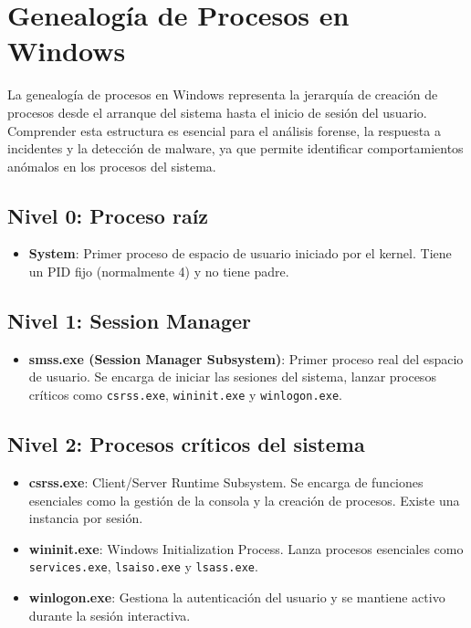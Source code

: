 \chapter{Genealogía de Procesos en Windows}

La genealogía de procesos en Windows representa la jerarquía de creación de
procesos desde el arranque del sistema hasta el inicio de sesión del usuario.
Comprender esta estructura es esencial para el análisis forense, la respuesta a
incidentes y la detección de malware, ya que permite identificar comportamientos
anómalos en los procesos del sistema.

\section*{Nivel 0: Proceso raíz}

\begin{itemize}
    \item \textbf{System}: Primer proceso de espacio de usuario iniciado por el
    kernel. Tiene un PID fijo (normalmente 4) y no tiene padre.
\end{itemize}

\section*{Nivel 1: Session Manager}

\begin{itemize}
    \item \textbf{smss.exe (Session Manager Subsystem)}: Primer proceso real del
    espacio de usuario. Se encarga de iniciar las sesiones del sistema, lanzar
    procesos críticos como \texttt{csrss.exe}, \texttt{wininit.exe} y
    \texttt{winlogon.exe}.
\end{itemize}

\section*{Nivel 2: Procesos críticos del sistema}

\begin{itemize}
    \item \textbf{csrss.exe}: Client/Server Runtime Subsystem. Se encarga de
    funciones esenciales como la gestión de la consola y la creación de
    procesos. Existe una instancia por sesión.
    \item \textbf{wininit.exe}: Windows Initialization Process. Lanza procesos
    esenciales como \texttt{services.exe}, \texttt{lsaiso.exe} y
    \texttt{lsass.exe}.
    \item \textbf{winlogon.exe}: Gestiona la autenticación del usuario y se
    mantiene activo durante la sesión interactiva.
\end{itemize}

